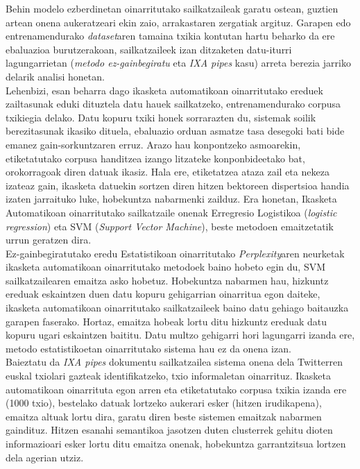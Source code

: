 \documentclass[information,article,submit,moreauthors,pdftex,10pt,a4paper]{Definitions/mdpi}
\begin{document}
\indent Behin modelo ezberdinetan oinarritutako sailkatzaileak garatu ostean, guztien artean onena aukeratzeari ekin zaio, arrakastaren zergatiak argituz. Garapen edo entrenamendurako \textit{dataset}aren tamaina txikia kontutan hartu beharko da ere ebaluazioa burutzerakoan, sailkatzaileek izan ditzaketen datu-iturri lagungarrietan (\textit{metodo ez-gainbegiratu} eta \textit{IXA pipes} kasu) arreta berezia jarriko delarik analisi honetan.\\
\indent Lehenbizi, esan beharra dago ikasketa automatikoan oinarritutako ereduek zailtasunak eduki dituztela datu hauek sailkatzeko, entrenamendurako corpusa txikiegia delako. Datu kopuru txiki honek sorrarazten du, sistemak soilik berezitasunak ikasiko dituela, ebaluazio orduan asmatze tasa desegoki bati bide emanez gain-sorkuntzaren erruz. Arazo hau konpontzeko asmoarekin, etiketatutako corpusa handitzea izango litzateke konponbideetako bat, orokorragoak diren datuak ikasiz. Hala ere, etiketatzea ataza zail eta nekeza izateaz gain, ikasketa datuekin sortzen diren hitzen bektoreen dispertsioa handia izaten jarraituko luke, hobekuntza nabarmenki zailduz. Era honetan, Ikasketa Automatikoan oinarritutako sailkatzaile onenak Erregresio Logistikoa (\textit{logistic regression}) eta SVM (\textit{Support Vector Machine}), beste metodoen emaitzetatik urrun geratzen dira.\\
\indent Ez-gainbegiratutako eredu Estatistikoan oinarritutako \textit{Perplexity}aren neurketak ikasketa automatikoan oinarritutako metodoek baino hobeto egin du, SVM sailkatzailearen emaitza asko hobetuz. Hobekuntza nabarmen hau, hizkuntz ereduak eskaintzen duen datu kopuru gehigarrian oinarritua egon daiteke, ikasketa automatikoan oinarritutako sailkatzaileek baino datu gehiago baitauzka garapen faserako. Hortaz, emaitza hobeak lortu ditu hizkuntz ereduak datu kopuru ugari eskaintzen baititu. Datu multzo gehigarri hori lagungarri izanda ere, metodo estatistikoetan oinarritutako sistema hau ez da onena izan.\\ 
\indent Baieztatu da \textit{IXA pipes} dokumentu sailkatzailea sistema onena dela Twitterren euskal txiolari gazteak identifikatzeko, txio informaletan oinarrituz. Ikasketa automatikoan oinarrituta egon arren eta etiketatutako corpusa txikia izanda ere (1000 txio), bestelako datuak lortzeko aukerari esker (hitzen irudikapena), emaitza altuak lortu dira, garatu diren beste sistemen emaitzak nabarmen gaindituz. Hitzen esanahi semantikoa jasotzen duten clusterrek gehitu dioten informazioari esker lortu ditu emaitza onenak, hobekuntza garrantzitsua lortzen dela agerian utziz.\\
\end{document}
